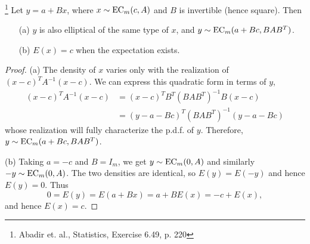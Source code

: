 \begin{lemma} \label{L:ell_lin}
\footnote{Abadir et. al., Statistics, Exercise 6.49, p. 220}
Let $y=a+Bx$, where $x\sim \operatorname*{EC}_m(c,A)$ and $B$ is invertible (hence square).
Then
\begin{enumerate}
\item[(a)] $y$ is also elliptical of the same type of $x$, and 
      $y\sim \operatorname*{EC}_m(a+Bc,BAB^T)$.
\item[(b)] $E(x)=c$ when the expectation exists.
\end{enumerate}
\end{lemma}
\begin{proof}
(a) The density of $x$ varies only with the realization of $(x-c)^T A^{-1} (x-c)$.
We can express this quadratic form in terms of $y$,
\begin{align*}
  (x-c)^T A^{-1} (x-c) &= (x-c)^T B^T (BAB^T)^{-1} B (x-c) \\
                       &= (y-a-Bc)^T (BAB^T)^{-1} (y-a-Bc) 
\end{align*}
whose realization will fully characterize the p.d.f. of $y$. Therefore, 
$y\sim \operatorname*{EC}_m(a+Bc,BAB^T)$.

(b) Taking $a=-c$ and $B=I_m$, we get $y\sim \operatorname*{EC}_m(0,A)$ and similarly 
$-y\sim \operatorname*{EC}_m(0,A)$. The two densities are identical, so $E(y)=E(-y)$ and hence
$E(y)=0$. Thus
\[
  0=E(y)=E(a+Bx)=a+B E(x)=-c+E(x),
\]
and hence $E(x)=c$.
\end{proof}


